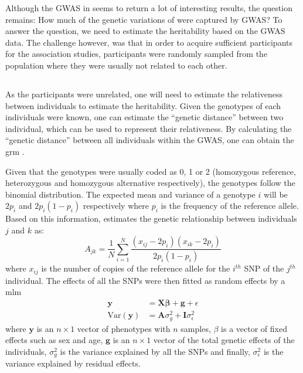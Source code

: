 	Although the \gls{GWAS} in  seems to return a lot of interesting results, the question remains: How much of the genetic variations of  were captured by \gls{GWAS}?
	To answer the question, we need to estimate the heritability based on the \gls{GWAS} data. 
	The challenge however, was that in order to acquire sufficient participants for the association studies, participants were randomly sampled from the population where they were usually not related to each other.
	
	\subsection{}
	As the participants were unrelated, one will need to estimate the relativeness between individuals to estimate the heritability.
	Given the genotypes of each individuals were known, one can estimate the ``genetic distance'' between two individual, which can be used to represent their relativeness.
	By calculating the ``genetic distance'' between all individuals within the \gls{GWAS}, one can obtain the \gls{grm} \citep{Yang2011}.
	
	Given that the genotypes were usually coded as 0, 1 or 2 (homozygous reference, heterozygous and homozygous alternative respectively), the genotypes follow the binomial distribution.
	The expected mean and variance of a genotype $i$ will be $2p_i$ and $2p_i(1-p_i)$ respectively where $p_i$ is the frequency of the reference allele.
	Based on this information, \citet{Yang2011} estimates the genetic relationship between individuals $j$ and $k$ as:
	\begin{equation}
	A_{jk} = \frac{1}{N}\sum^N_{i=1}\frac{(x_{ij}-2p_i)(x_{ik}-2p_i)}{2p_i(1-p_i)}
	\end{equation}
	where $x_{ij}$ is the number of copies of the reference allele for the $i^{th}$ \gls{SNP} of the $j^{th}$ individual.
	The effects of all the \glspl{SNP} were then fitted as random effects by a \gls{mlm}
	\begin{align}
	\boldsymbol{y} &= \boldsymbol{X\beta}+\boldsymbol{g}+\epsilon\\
	\mathrm{Var}(\boldsymbol{y}) &= \boldsymbol{A}\sigma_g^2+\boldsymbol{I}\sigma_\epsilon^2
	\end{align}
	where $\boldsymbol{y}$ is an $n\times 1$ vector of phenotypes with $n$ samples, $\beta$ is a vector of fixed effects such as sex and age, $\boldsymbol{g}$ is an $n\times 1$ vector of the total genetic effects of the individuals, $\sigma_g^2$ is the variance explained by all the \glspl{SNP} and finally, $\sigma_\epsilon^2$ is the variance explained by residual effects.
	
